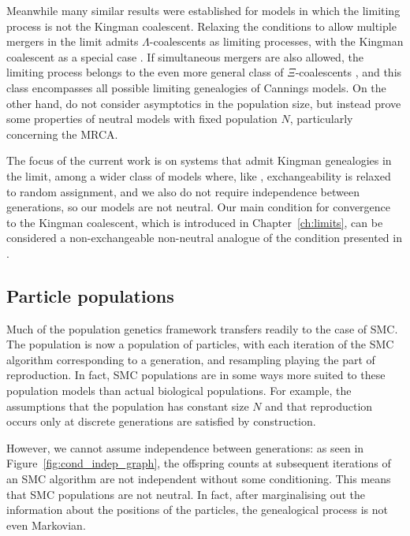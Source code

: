 Meanwhile many similar results were established for models in which the limiting process is not the Kingman coalescent.
Relaxing the conditions to allow multiple mergers in the limit admits $\Lambda$-coalescents as limiting processes, with the Kingman coalescent as a special case \parencite{pitman1999, sagitov1999, mohlesagitov1998}.
If simultaneous mergers are also allowed, the limiting process belongs to the even more general class of $\Xi$-coalescents \parencite{mohle2001}, and this class encompasses all possible limiting genealogies of Cannings models.
On the other hand, \textcite{delmoral2009} do not consider asymptotics in the population size, but instead prove some properties of neutral models with fixed population $N$, particularly concerning the MRCA. 

The focus of the current work is on systems that admit Kingman genealogies in the limit, among a wider class of models where, like \textcite{mohle1998, mohle1999}, exchangeability is relaxed to random assignment, and we also do not require independence between generations, so our models are not neutral. 
Our main condition for convergence to the Kingman coalescent, which is introduced in Chapter~\ref{ch:limits}, can be considered a non-exchangeable non-neutral analogue of the condition presented in \textcite{mohle2000}.




\subsection{Particle populations}
Much of the population genetics framework transfers readily to the case of SMC. The population is now a population of particles, with each iteration of the SMC algorithm corresponding to a generation, and resampling playing the part of reproduction.
In fact, SMC populations are in some ways more suited to these population models than actual biological populations.
For example, the assumptions that the population has constant size $N$ and that reproduction occurs only at discrete generations are satisfied by construction.

However, we cannot assume independence between generations: as seen in Figure~\ref{fig:cond_indep_graph}, the offspring counts at subsequent iterations of an SMC algorithm are not independent without some conditioning. 
This means that SMC populations are not neutral.
In fact, after marginalising out the information about the positions of the particles, the genealogical process is not even Markovian.






